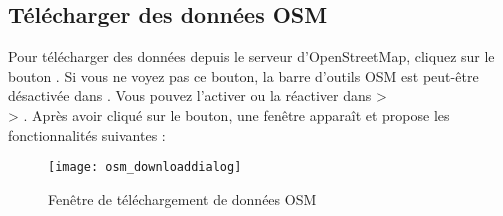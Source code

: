 \subsection{Télécharger des données OSM}  

Pour télécharger des données depuis le serveur d'OpenStreetMap, cliquez sur le bouton . Si vous ne voyez pas ce bouton, la barre d'outils OSM est peut-être désactivée dans \qg. Vous pouvez l'activer ou la réactiver dans  >\\  > . Après avoir cliqué sur le bouton, une fenêtre apparaît et propose les fonctionnalités suivantes :

\begin{figure}[ht]
\centering
   
   \texttt{[image: osm\_downloaddialog]}
   \caption{Fenêtre de téléchargement de données OSM \nixcaption}\label{fig:osmdownload}
\end{figure}

